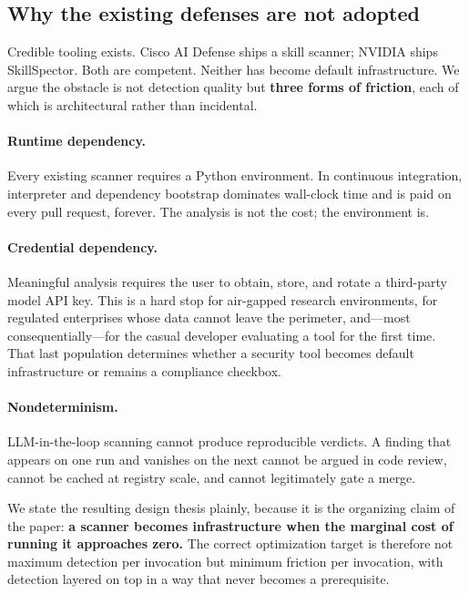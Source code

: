 \documentclass[11pt]{article}
\begin{document}
\subsection{Why the existing defenses are not adopted}

Credible tooling exists. Cisco AI Defense ships a skill scanner; NVIDIA ships
SkillSpector. Both are competent. Neither has become default infrastructure. We
argue the obstacle is not detection quality but \textbf{three forms of
friction}, each of which is architectural rather than incidental.

\paragraph{Runtime dependency.} Every existing scanner requires a Python
environment. In continuous integration, interpreter and dependency bootstrap
dominates wall-clock time and is paid on every pull request, forever. The
analysis is not the cost; the environment is.

\paragraph{Credential dependency.} Meaningful analysis requires the user to
obtain, store, and rotate a third-party model API key. This is a hard stop for
air-gapped research environments, for regulated enterprises whose data cannot
leave the perimeter, and---most consequentially---for the casual developer
evaluating a tool for the first time. That last population determines whether a
security tool becomes default infrastructure or remains a compliance checkbox.

\paragraph{Nondeterminism.} LLM-in-the-loop scanning cannot produce
reproducible verdicts. A finding that appears on one run and vanishes on the
next cannot be argued in code review, cannot be cached at registry scale, and
cannot legitimately gate a merge.

We state the resulting design thesis plainly, because it is the organizing
claim of the paper: \textbf{a scanner becomes infrastructure when the marginal
cost of running it approaches zero.} The correct optimization target is
therefore not maximum detection per invocation but minimum friction per
invocation, with detection layered on top in a way that never becomes a
prerequisite.
\end{document}
